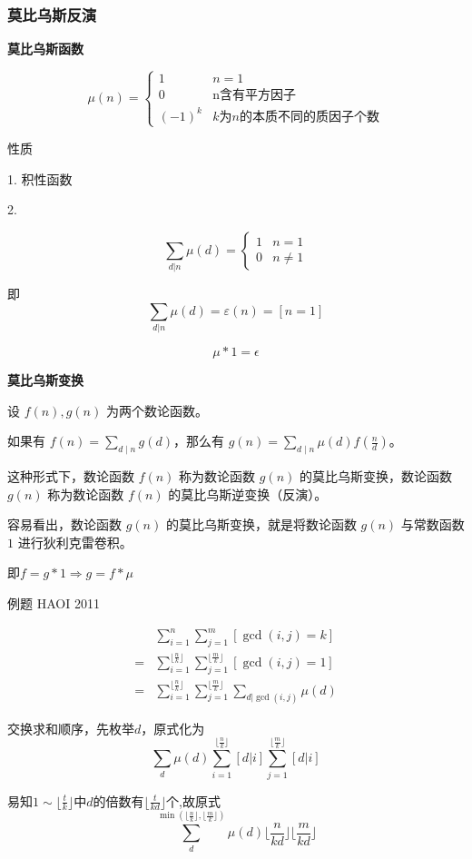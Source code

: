 \documentclass[UTF8]{ctexart}
\begin{document}
\subsubsection{莫比乌斯反演}
\textbf{莫比乌斯函数}

$$
\mu(n)=\left\{
    \begin{array}{ll}
    1&n=1\\
    0&\text{n含有平方因子}\\
    (-1)^k&k为n的本质不同的质因子个数
    \end{array}
\right.
$$

性质

1. 积性函数

2. 

$$
\sum\limits_{d|n}\mu(d)=\left\{
\begin{array}{ll}
1 &n=1\\
0 &n\neq 1
\end{array}
\right.
$$

即$$\sum\limits_{d|n}\mu(d)=\varepsilon(n)=[n=1]$$

$$\mu\ast1=\epsilon$$

\textbf{莫比乌斯变换}

设 $f(n),g(n)$ 为两个数论函数。

如果有 $f(n)=\sum_{d\mid n}g(d)$，那么有 $g(n)=\sum_{d\mid n}\mu(d)f(\frac{n}{d})$。

这种形式下，数论函数 $f(n)$ 称为数论函数 $g(n)$ 的莫比乌斯变换，数论函数 $g(n)$ 称为数论函数 $f(n)$ 的莫比乌斯逆变换（反演）。

容易看出，数论函数 $g(n)$ 的莫比乌斯变换，就是将数论函数 $g(n)$ 与常数函数 $1$ 进行狄利克雷卷积。

即$f=g\ast 1 \Rightarrow g=f\ast\mu$

例题 HAOI 2011

$$\begin{aligned}&\sum\limits_{i=1}^n\sum\limits_{j=1}^m[\gcd(i,j)=k]\\
=&\sum\limits_{i=1}^{\lfloor \frac{n}{k}\rfloor}\sum\limits_{j=1}^{\lfloor \frac{m}{k}\rfloor}[\gcd(i,j)=1]\\
=&\sum\limits_{i=1}^{\lfloor \frac{n}{k}\rfloor}\sum\limits_{j=1}^{\lfloor \frac{m}{k}\rfloor}\sum\limits_{d|\gcd(i,j)}\mu(d)\end{aligned}$$

交换求和顺序，先枚举$d$，原式化为
$$\sum\limits_{d}\mu(d)\sum\limits_{i=1}^{\lfloor \frac{n}{k}\rfloor}{[d|i]}\sum\limits_{j=1}^{\lfloor \frac{m}{k}\rfloor}{[d|i]}$$

易知$1\sim \lfloor\frac{t}{k}\rfloor$中$d$的倍数有$\lfloor\frac{t}{kd}\rfloor$个,故原式
$$\sum\limits_{d}^{\min{(\lfloor\frac{n}{k}\rfloor,\lfloor\frac{m}{k}\rfloor)}}\mu(d)\lfloor\frac{n}{kd}\rfloor\lfloor\frac{m}{kd}\rfloor$$
\end{document}
